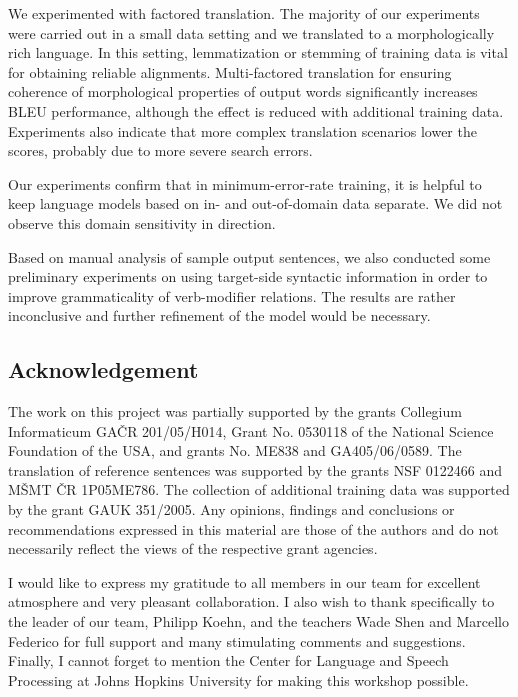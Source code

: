 \documentclass[10pt]{report}
\theoremstyle{plain}
\begin{document}
{{We experimented with factored \tocs{} translation. The majority of our
experiments were carried out in a small data setting and we translated to a
morphologically rich language. In this setting, lemmatization or stemming of
training data is vital for obtaining reliable alignments. Multi-factored
translation for ensuring coherence of morphological properties of output words
significantly increases BLEU performance, although the effect is reduced with
additional training data. Experiments also indicate that more complex
translation scenarios lower the scores, probably due to more severe search
errors.

Our \tocs{} experiments confirm that in minimum-error-rate training, it is
helpful to keep language models based on in- and out-of-domain data separate. We
did not observe this domain sensitivity in \toen{} direction.

Based on manual analysis of sample output sentences, we also conducted some
preliminary experiments on using target-side syntactic information in order to
improve grammaticality of verb-modifier relations.  The results are rather
inconclusive and further refinement of the model would be necessary.



\subsection{Acknowledgement}

The work on this project was partially supported by the grants 
Collegium Informaticum GA\v{C}R 201/05/H014,
Grant No. 0530118 of the National Science Foundation of the USA,
and grants No. ME838 and GA405/06/0589.
The translation of reference sentences was supported by the grants
NSF 0122466 and M\v{S}MT \v{C}R 1P05ME786. The collection of additional training
data was supported by the grant GAUK 351/2005.
Any opinions, findings and conclusions or recommendations expressed in this
material are those of the authors and do not necessarily reflect the views of
the respective grant agencies.

I would like to express my gratitude to all members in our team for excellent
atmosphere and very pleasant collaboration. I also wish to thank specifically to
the leader of our team, Philipp Koehn, and the teachers Wade Shen and Marcello
Federico for full support and many stimulating comments and suggestions.
Finally, I cannot forget to mention the Center for Language and Speech Processing at Johns Hopkins
University for making this workshop possible.


}}
\end{document}
